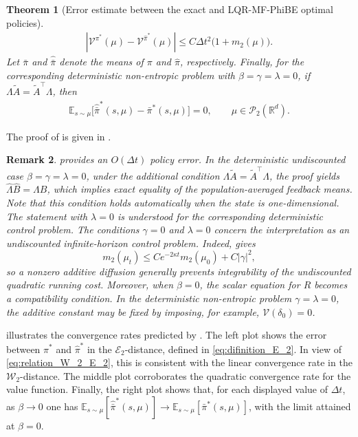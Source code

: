 \documentclass[a4paper, 10pt, english, reqno]{amsart}
\newtheorem{theorem}{Theorem}[section]
\newtheorem{remark}[theorem]{Remark}
\begin{document}
\begin{theorem}[Error estimate between the exact and LQR-MF-PhiBE optimal policies]
\begin{align}\label{eq:error_value_functions_LQR}
    \left|
\mathcal V^{\pi^*}(\mu)-\mathcal V^{\hat\pi^*}(\mu)
\right|
\le
C\Delta t^2\bigl(1+m_2(\mu)\bigr).
\end{align}
Let $\bar\pi$ and $\widehat{\bar\pi}$ denote the means of $\pi$ and $\hat\pi$, respectively. Finally, for the corresponding deterministic non-entropic problem with $\beta=\gamma=\lambda=0$, if $\Lambda\tilde A=\tilde A^\top\Lambda$, then
\begin{align}
\label{eq:same_expectation_optimal_policies}
      \mathbb{E}_{s\sim\mu}\bigl[\widehat{\bar\pi}^*(s,\mu)-\bar\pi^*(s,\mu)\bigr]=0,
  \qquad
  \mu\in\mathcal P_2(\mathbb R^d).
\end{align}
\end{theorem}
The proof of  is given in . 



\begin{remark}
\label{rem:undiscounted-LQR-MF-PhiBE}
 provides an $O(\Delta t)$ policy error. In the deterministic undiscounted case
$\beta=\gamma=\lambda=0$, under the additional condition
$\Lambda\tilde A=\tilde A^\top\Lambda$, the proof yields
$\hat\Lambda\hat B=\Lambda B$, which implies exact equality of the population-averaged feedback means.  Note that this condition holds automatically when the state is one-dimensional. The statement with $\lambda=0$ is understood for the corresponding deterministic control problem. The conditions $\gamma=0$ and $\lambda=0$ concern the interpretation as
an undiscounted infinite-horizon control problem. Indeed,
 gives
\[
m_2(\mu_t)
\le
Ce^{-2\kappa t}m_2(\mu_0)+C|\gamma|^2,
\]
so a nonzero additive diffusion generally prevents integrability of the
undiscounted quadratic running cost. Moreover, when $\beta=0$, the
scalar equation for $R$ becomes a compatibility condition. In the
deterministic non-entropic problem $\gamma=\lambda=0$, the additive
constant may be fixed by imposing, for example,
$\mathcal V(\delta_0)=0$.
\end{remark}
 illustrates the convergence rates predicted by . The left plot shows the error between $\pi^*$ and $\widehat\pi^*$ in the $\mathcal{E}_2$-distance, defined in \eqref{eq:difinition_E_2}. In view of \eqref{eq:relation_W_2_E_2}, this is consistent with the linear convergence rate in the $\mathcal{W}_2$-distance. The middle plot corroborates the quadratic convergence rate for the value function. Finally, the right plot shows that, for each displayed value of $\Delta t$, as $\beta\to0$ one has
$\mathbb{E}_{s\sim\mu}[\widehat{\bar\pi}^*(s,\mu)]\to \mathbb{E}_{s\sim\mu}[\bar\pi^*(s,\mu)]$,
with the limit attained at $\beta=0$.
\end{document}
